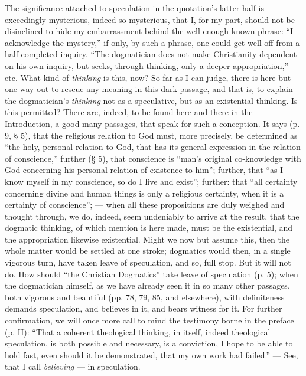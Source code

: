 \documentclass[12pt]{book}
\begin{document}
The significance attached to speculation in the quotation's latter half is exceedingly mysterious, indeed so mysterious, that I, for my part, should not be disinclined to hide my embarrassment behind the well-enough-known phrase: ``I acknowledge the mystery,'' if only, by such a phrase, one could get well off from a half-completed inquiry. ``The dogmatician does not make Christianity dependent on his own inquiry, but seeks, through thinking, only a deeper appropriation,'' etc. What kind of \emph{thinking} is this, now? So far as I can judge, there is here but one way out to rescue any meaning in this dark passage, and that is, to explain the dogmatician's \emph{thinking} not as a speculative, but as an existential thinking. Is this permitted? There are, indeed, to be found here and there in the Introduction, a good many passages, that speak for such a conception. It says (p. 9, § 5), that the religious relation to God must, more precisely, be determined as ``the holy, personal relation to God, that has its general expression in the relation of conscience,'' further (§ 5), that conscience is ``man's original co-knowledge with God concerning his personal relation of existence to him''; further, that ``as I know myself in my conscience, so do I live and exist''; further: that ``all certainty concerning divine and human things is only a religious certainty, when it is a certainty of conscience''; --- when all these propositions are duly weighed and thought through, we do, indeed, seem undeniably to arrive at the result, that the dogmatic thinking, of which mention is here made, must
be the existential, and the appropriation likewise existential. Might we now but assume this, then the whole matter would be settled at one stroke; dogmatics would then, in a single vigorous turn, have taken leave of speculation, and so, full stop. But it will not do. How should ``the Christian Dogmatics'' take leave of speculation (p. 5); when the dogmatician himself, as we have already seen it in so many other passages, both vigorous and beautiful (pp. 78, 79, 85, and elsewhere), with definiteness demands speculation, and believes in it, and bears witness for it. For further confirmation, we will once more call to mind the testimony borne in the preface (p. II): ``That a coherent theological thinking, in itself, indeed theological speculation, is both possible and necessary, is a conviction, I hope to be able to hold fast, even should it be demonstrated, that my own work had failed.'' --- See, that I call \emph{believing} --- in speculation.
\end{document}
